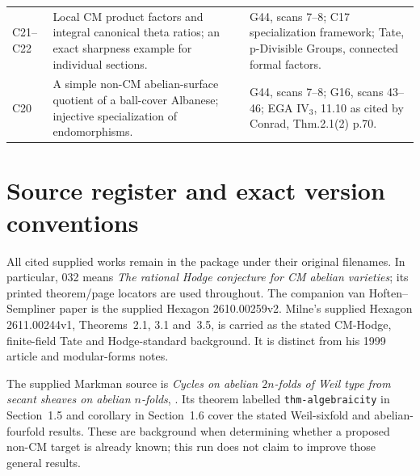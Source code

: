 \documentclass[11pt]{article}
\theoremstyle{definition}\newtheorem{definition}[theorem]{Definition}\newtheorem{remark}[theorem]{Remark}
\begin{document}
\begin{longtable}{@{}p{.18\linewidth}p{.48\linewidth}p{.27\linewidth}@{}}
C21--C22 & Local CM product factors and integral canonical theta ratios; an exact sharpness example for individual sections. & G44, scans 7--8; C17 specialization framework; Tate, p-Divisible Groups, connected formal factors.\\
C20 & A simple non-CM abelian-surface quotient of a ball-cover Albanese; injective specialization of endomorphisms. & G44, scans 7--8; G16, scans 43--46; EGA IV$_3$, 11.10 as cited by Conrad, Thm.2.1(2) p.70.\\
\bottomrule
\end{longtable}

\section{Source register and exact version conventions}

All cited supplied works remain in the package under their original
filenames. In particular, 032 means
\emph{The rational Hodge conjecture for CM abelian varieties}; its
printed theorem/page locators are used throughout. The companion
van Hoften--Sempliner paper is the supplied Hexagon 2610.00259v2.
Milne's supplied Hexagon 2611.00244v1, Theorems~2.1, 3.1 and~3.5,
is carried as the stated CM-Hodge, finite-field Tate and Hodge-standard
background. It is distinct from his 1999 article and modular-forms notes.

The supplied Markman source is \emph{Cycles on abelian $2n$-folds of
Weil type from secant sheaves on abelian $n$-folds},
.
Its theorem labelled \texttt{thm-algebraicity} in Section~1.5 and
corollary in Section~1.6 cover the stated Weil-sixfold and
abelian-fourfold results. These are background when determining
whether a proposed non-CM target is already known; this run does
not claim to improve those general results.
\end{document}
